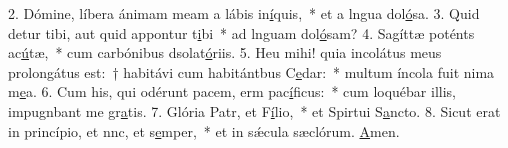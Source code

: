 2. Dómine, líbera ánimam meam a lábis in\uline{í}quis,~* et a lngua dol\uline{ó}sa.
3. Quid detur tibi, aut quid appontur t\uline{i}bi~* ad lnguam dol\uline{ó}sam?
4. Sagíttæ poténts ac\uline{ú}tæ,~* cum carbónibus dsolat\uline{ó}riis.
5. Heu mihi! quia incolátus meus prolongátus est:~† habitávi cum habitántbus C\uline{e}dar:~* multum íncola fuit nima m\uline{e}a.
6. Cum his, qui odérunt pacem, erm pac\uline{í}ficus:~* cum loquébar illis, impugnbant me gr\uline{a}tis.
7. Glória Patr, et F\uline{í}lio,~* et Spirtui S\uline{a}ncto.
8. Sicut erat in princípio, et nnc, et s\uline{e}mper,~* et in sǽcula sæclórum. \uline{A}men.
